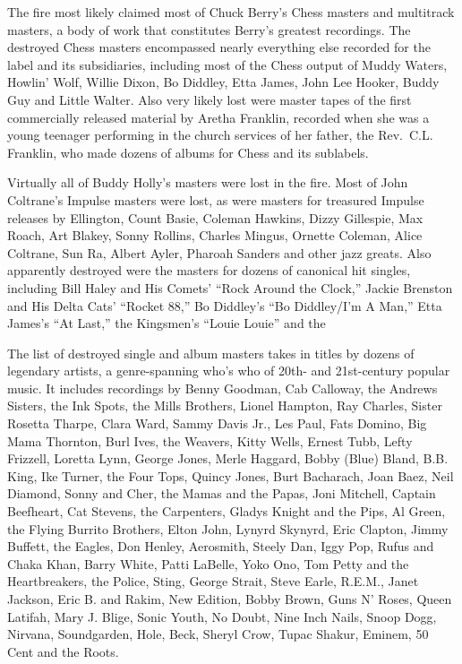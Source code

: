 \documentclass[10pt]{article}
\begin{document}
\begin{multicols}{2}
{\begin{leftbar}
  The fire most likely claimed most of Chuck Berry's Chess masters and
  multitrack masters, a body of work that constitutes Berry's greatest
  recordings. The destroyed Chess masters encompassed nearly everything
  else recorded for the label and its subsidiaries, including most of
  the Chess output of Muddy Waters, Howlin' Wolf, Willie Dixon, Bo
  Diddley, Etta James, John Lee Hooker, Buddy Guy and Little Walter.
  Also very likely lost were master tapes of the first commercially
  released material by Aretha Franklin, recorded when she was a young
  teenager performing in the church services of her father, the
  Rev.~C.L. Franklin, who made dozens of albums for Chess and its
  sublabels.

  Virtually all of Buddy Holly's masters were lost in the fire. Most of
  John Coltrane's Impulse masters were lost, as were masters for
  treasured Impulse releases by Ellington, Count Basie, Coleman Hawkins,
  Dizzy Gillespie, Max Roach, Art Blakey, Sonny Rollins, Charles Mingus,
  Ornette Coleman, Alice Coltrane, Sun Ra, Albert Ayler, Pharoah Sanders
  and other jazz greats. Also apparently destroyed were the masters for
  dozens of canonical hit singles, including Bill Haley and His Comets'
  ``Rock Around the Clock,'' Jackie Brenston and His Delta Cats'
  ``Rocket 88,'' Bo Diddley's ``Bo Diddley/I'm A Man,'' Etta James's
  ``At Last,'' the Kingsmen's ``Louie Louie'' and the

  The list of destroyed single and album masters takes in titles by
  dozens of legendary artists, a genre-spanning who's who of 20th- and
  21st-century popular music. It includes recordings by Benny Goodman,
  Cab Calloway, the Andrews Sisters, the Ink Spots, the Mills Brothers,
  Lionel Hampton, Ray Charles, Sister Rosetta Tharpe, Clara Ward, Sammy
  Davis Jr., Les Paul, Fats Domino, Big Mama Thornton, Burl Ives, the
  Weavers, Kitty Wells, Ernest Tubb, Lefty Frizzell, Loretta Lynn,
  George Jones, Merle Haggard, Bobby (Blue) Bland, B.B. King, Ike
  Turner, the Four Tops, Quincy Jones, Burt Bacharach, Joan Baez, Neil
  Diamond, Sonny and Cher, the Mamas and the Papas, Joni Mitchell,
  Captain Beefheart, Cat Stevens, the Carpenters, Gladys Knight and the
  Pips, Al Green, the Flying Burrito Brothers, Elton John, Lynyrd
  Skynyrd, Eric Clapton, Jimmy Buffett, the Eagles, Don Henley,
  Aerosmith, Steely Dan, Iggy Pop, Rufus and Chaka Khan, Barry White,
  Patti LaBelle, Yoko Ono, Tom Petty and the Heartbreakers, the Police,
  Sting, George Strait, Steve Earle, R.E.M., Janet Jackson, Eric B. and
  Rakim, New Edition, Bobby Brown, Guns N' Roses, Queen Latifah, Mary J.
  Blige, Sonic Youth, No Doubt, Nine Inch Nails, Snoop Dogg, Nirvana,
  Soundgarden, Hole, Beck, Sheryl Crow, Tupac Shakur, Eminem, 50 Cent
  and the Roots.


\end{leftbar}}
\end{multicols}
\end{document}
